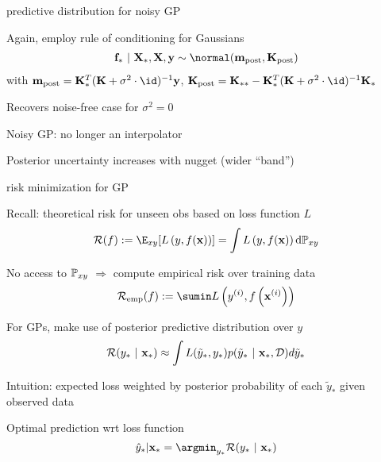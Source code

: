 \documentclass[11pt,compress,t,notes=noshow, xcolor=table]{beamer}
\begin{document}
\begin{framei}[sep=M]{predictive distribution for noisy GP}
\item Again, employ rule of conditioning for Gaussians 
\begin{eqnarray*}
\fv_* ~|~ \Xmat_*, \Xmat, \yv \sim \normal(\mv_{\text{post}}, \Kmat_\text{post})
\end{eqnarray*}
with 
$\mv_{\text{post}} = \Ks^{T} (\Kmat+ \sigma^2 \cdot \id)^{-1}\yv$, 
$\Kmat_\text{post} = \Kss - \Ks^T (\Kmat  + \sigma^2 \cdot \id)^{-1}\Ks$
\item Recovers noise-free case for $\sigma^2 = 0$
\item Noisy GP: no longer an interpolator 
\item Posterior uncertainty increases with nugget (wider ``band'')
\vfill
{}
\end{framei}

\begin{framei}[sep=M]{risk minimization for GP}
\item Recall: theoretical risk for unseen obs based on loss function $L$
$$\riskf := \E_{xy} [\Lxy] = \int \Lxy \text{d}\Pxy$$ 
\item No access to $\mathbb{P}_{xy}$ $\Rightarrow$ compute empirical risk over training data $$\riske(f) := \sumin \Lxyi$$ 
\item For GPs, make use of posterior predictive distribution over $y$
$$
    \mathcal{R}(y_* ~|~ \mathbf{x}_\ast) \approx \int L(\tilde y_*, y_*) p(\tilde y_*~|~\mathbf{x}_\ast, \mathcal{D})d\tilde y_*
  $$
\item Intuition: expected loss weighted by posterior probability of each $\tilde y_*$ given observed data
\item Optimal prediction wrt loss function
$$
    \yh_* | \xs = \argmin_{y_*} \mathcal{R}(y_*~|~ \xs)
  $$
\end{framei}






\end{document}

